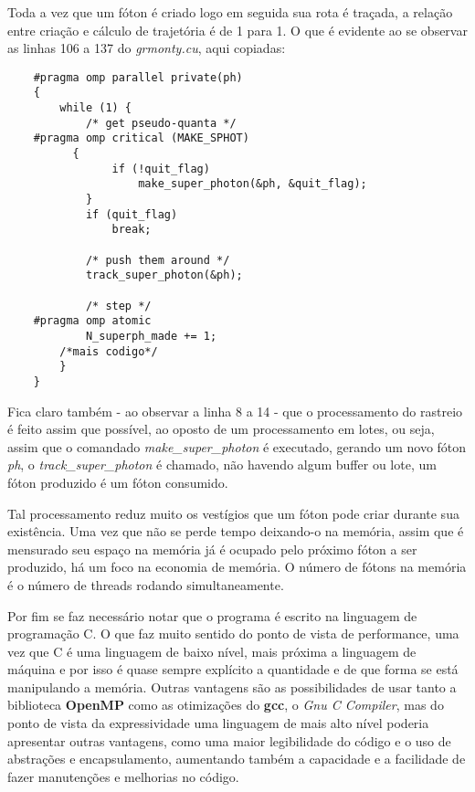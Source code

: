   Toda a vez que um fóton é criado logo em seguida sua rota é traçada, a relação entre criação e cálculo de trajetória é de 1 para 1. O que é evidente ao se observar as linhas 106 a 137 do \textit{grmonty.cu}, aqui copiadas:

  \label{sec:main_loop}
  \begin{lstlisting}
    #pragma omp parallel private(ph)
  	{
  		while (1) {
  			/* get pseudo-quanta */
    #pragma omp critical (MAKE_SPHOT)
  		  {
  				if (!quit_flag)
  					make_super_photon(&ph, &quit_flag);
  			}
  			if (quit_flag)
  				break;

  			/* push them around */
  			track_super_photon(&ph);

  			/* step */
    #pragma omp atomic
  			N_superph_made += 1;
        /*mais codigo*/
  		}
  	}
  \end{lstlisting}

  Fica claro também - ao observar a linha 8 a 14 - que o processamento do rastreio é feito assim que possível, ao oposto de um processamento em lotes, ou seja, assim que o comandado \textit{make\_super\_photon} é executado, gerando um novo fóton \textit{ph}, o  \textit{track\_super\_photon} é chamado, não havendo algum buffer ou lote, um fóton produzido é um fóton consumido.

  Tal processamento reduz muito os vestígios que um fóton pode criar durante sua existência. Uma vez que não se perde tempo deixando-o na memória, assim que é mensurado seu espaço na memória já é ocupado pelo próximo fóton a ser produzido, há um foco na economia de memória. O número de fótons na memória é o número de threads rodando simultaneamente.

  Por fim se faz necessário notar que o programa é escrito na linguagem de programação C. O que faz muito sentido do ponto de vista de performance, uma vez que C é uma linguagem de baixo nível, mais próxima a linguagem de máquina e por isso é quase sempre explícito a quantidade e de que forma se está manipulando a memória. Outras vantagens são as possibilidades de usar tanto a biblioteca \textbf{OpenMP} como as otimizações do \textbf{gcc}, o \textit{Gnu C Compiler}, mas do ponto de vista da expressividade uma linguagem de mais alto nível poderia apresentar outras vantagens, como uma maior legibilidade do código e o uso de abstrações e encapsulamento, aumentando também a capacidade e a facilidade de fazer manutenções e melhorias no código.
